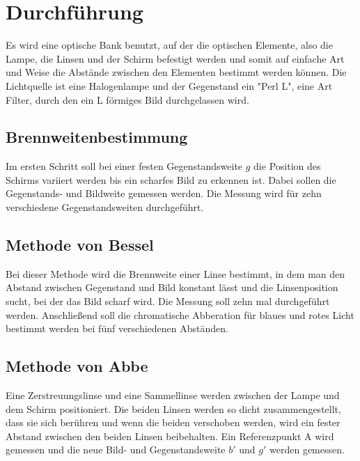 \section{Durchführung}
\label{sec:Durchführung}

Es wird eine optische Bank benutzt, auf der die optischen Elemente, also die Lampe, die Linsen und  der Schirm befestigt werden und somit auf einfache Art und Weise die Abstände zwischen den Elementen bestimmt werden können. 
Die Lichtquelle ist eine Halogenlampe und der Gegenstand ein "Perl L", eine Art Filter, durch den ein L förmiges Bild durchgelassen wird. 

\subsection{Brennweitenbestimmung}
Im ersten Schritt soll bei einer festen Gegenstandsweite $g$ die Position des Schirms variiert werden bis ein scharfes Bild zu erkennen ist. Dabei sollen die Gegenstands- und Bildweite gemessen werden. 
Die Messung wird für zehn verschiedene Gegenstandsweiten durchgeführt.

\subsection{Methode von Bessel}
Bei dieser Methode wird die Brennweite einer Linse bestimmt, in dem man den Abstand zwischen Gegenstand und Bild konstant lässt und die Linsenposition sucht, bei der das Bild scharf wird. 
Die Messung soll zehn mal durchgeführt werden. Anschließend soll die chromatische Abberation für blaues und rotes Licht bestimmt werden bei fünf verschiedenen Abständen. 

\subsection{Methode von Abbe}
Eine Zerstreuungslinse und eine Sammellinse werden zwischen der Lampe und dem Schirm positioniert. Die beiden Linsen werden so dicht zusammengestellt, dass sie sich berühren und wenn die beiden verschoben werden, wird ein fester Abstand zwischen den beiden Linsen beibehalten. Ein Referenzpunkt A wird gemessen und die neue Bild- und Gegenstandsweite $b'$ und $g'$ werden gemessen. 

